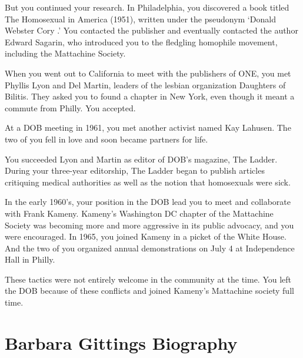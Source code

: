 But you continued your research. In Philadelphia, you discovered a book titled The Homosexual in America (1951), written under the pseudonym `Donald Webster Cory .' You contacted the publisher and eventually contacted the author Edward Sagarin, who introduced you to the fledgling homophile movement, including the Mattachine Society.

When you went out to California to meet with the publishers of ONE, you met Phyllis Lyon and Del Martin, leaders of the lesbian organization Daughters of Bilitis. They asked you to found a chapter in New York, even though it meant a commute from Philly. You accepted. 

At a DOB meeting in 1961, you met another activist named Kay Lahusen. The two of you fell in love and soon became partners for life.

You succeeded Lyon and Martin as editor of DOB's magazine, The Ladder. During your three-year editorship, The Ladder began to publish articles critiquing medical authorities as well as the notion that homosexuals were sick.

In the early 1960's, your position in the DOB lead you to meet and collaborate with Frank Kameny. Kameny's Washington DC chapter of the Mattachine Society was becoming more and more aggressive in its public advocacy, and you were encouraged. In 1965, you joined Kameny in a picket of the White House. And the two of you organized annual demonstrations on July 4 at Independence Hall in Philly.

These tactics were not entirely welcome in the community at the time. You left the DOB because of these conflicts and joined Kameny's Mattachine society full time.

\section{Barbara Gittings Biography}
\label{barbaragittingsbiography}

